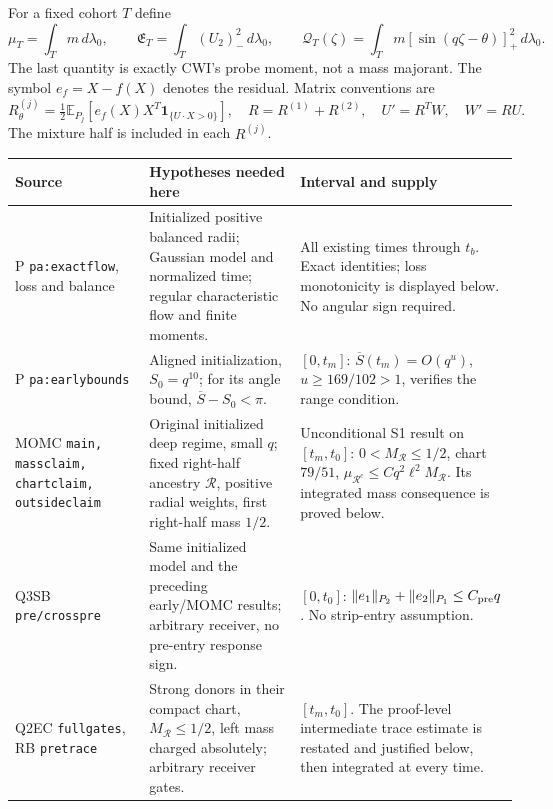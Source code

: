 \documentclass[11pt]{article}
\numberwithin{equation}{section}
\theoremstyle{remark}\newtheorem{remark}[theorem]{Remark}
\newcommand{\E}{\mathbb E}\newcommand{\dd}{\,d}
\newcommand{\one}{\mathbf1}\newcommand{\eps}{\varepsilon}
\newcommand{\EE}{\mathfrak E}
\begin{document}
For a fixed cohort \(T\) define
\[
 \mu_T=\int_Tm\dd\lambda_0,\qquad
 \EE_T=\int_T(U_2)_-^2\dd\lambda_0,\qquad
 \mathcal Q_T(\zeta)=
 \int_Tm[\sin(q\zeta-\theta)]_+^2\dd\lambda_0 .
 \]
The last quantity is exactly CWI's probe moment, not a mass
majorant. The symbol \(e_f=X-f(X)\) denotes the residual.
Matrix conventions are
\begin{equation}
 R^{(j)}_\theta=\tfrac12\E_{P_j}
       [e_f(X)X^T\one_{\{U\cdot X>0\}}],\quad
 R=R^{(1)}+R^{(2)},\quad U'=R^TW,\quad W'=RU .
 \label{an07psev1:matrixconvention}
\end{equation}
The mixture half is included in each \(R^{(j)}\).

\small
\begin{longtable}{>{\raggedright\arraybackslash}p{}
 >{\raggedright\arraybackslash}p{}
 >{\raggedright\arraybackslash}p{}}
\toprule Source & Hypotheses needed here & Interval and supply\\\midrule\endhead
P \texttt{pa:exactflow}, loss and balance
& Initialized positive balanced radii; Gaussian model and normalized
 time; regular characteristic flow and finite moments.
& All existing times through \(t_b\). Exact identities;
 loss monotonicity is displayed below. No angular sign required.\\
P \texttt{pa:earlybounds}
& Aligned initialization, \(S_0=q^{10}\); for its angle bound,
 \(\overline S-S_0<\pi\).
& \([0,t_m]\): \(\overline S(t_m)=O(q^u)\),
 \(u\ge169/102>1\), verifies the range condition.\\
MOMC \texttt{main, massclaim, chartclaim, outsideclaim}
& Original initialized deep regime, small \(q\); fixed right-half
 ancestry \(\mathcal R\), positive radial weights, first right-half
 mass \(1/2\).
& Unconditional S1 result on \([t_m,t_0]\):
 \(0<M_{\mathcal R}\le1/2\), chart \(79/51\),
 \(\mu_{\mathcal R^c}\le Cq^2\ell^2M_{\mathcal R}\).
 Its integrated mass consequence is proved below.\\
Q3SB \texttt{pre/crosspre}
& Same initialized model and the preceding early/MOMC results;
 arbitrary receiver, no pre-entry response sign.
& \([0,t_0]\): \(\|e_1\|_{P_2}+\|e_2\|_{P_1}\le C_{\rm pre}q\).
 No strip-entry assumption.\\
Q2EC \texttt{fullgates}, RB \texttt{pretrace}
& Strong donors in their compact chart, \(M_{\mathcal R}\le1/2\),
 left mass charged absolutely; arbitrary receiver gates.
& \([t_m,t_0]\). The proof-level intermediate trace estimate
 is restated and justified below, then integrated at every time.\\

\end{longtable}
\end{document}
